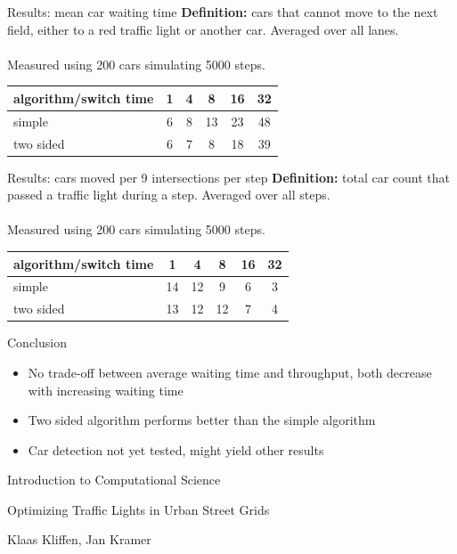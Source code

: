 \documentclass[11pt]{beamer}
\begin{document}
\begin{frame}{Results: mean car waiting time}
\textbf{Definition:} cars that cannot move to the next field, either to a 
red traffic light or another car. Averaged over all lanes.\\~\\
Measured using 200 cars simulating 5000 steps.

\begin{table}
\centering
\begin{tabular}{l|c|c|c|c|c}
algorithm/switch time & 1 & 4 & 8 & 16 & 32\\
\hline
simple & 6 & 8 & 13 & 23 & 48\\
two sided & 6 & 7 & 8 & 18 & 39\\
\end{tabular}
\end{table}
 
\end{frame}

\begin{frame}{Results: cars moved per 9 intersections per step}
\textbf{Definition:} total car count that passed a traffic light during a step.
Averaged over all steps.\\~\\
Measured using 200 cars simulating 5000 steps.
\begin{table}
\centering
\begin{tabular}{l|c|c|c|c|c}
algorithm/switch time & 1 & 4 & 8 & 16 & 32\\
\hline
simple & 14 & 12 & 9 & 6 & 3\\
two sided & 13 & 12 & 12 & 7 & 4\\
\end{tabular}
\end{table}
 
\end{frame}


\begin{frame}{Conclusion}

\begin{itemize}
 \item No trade-off between average waiting time and throughput, both decrease with increasing waiting time
 \item Two sided algorithm performs better than the simple algorithm
 \item Car detection not yet tested, might yield other results
\end{itemize}

    
\end{frame}

\begin{frame}{Introduction to Computational Science}
\begin{center}
{\large Optimizing Traffic Lights in Urban Street Grids}\\
\end{center}

\begin{center}
Klaas Kliffen, Jan Kramer
\end{center}

    
\end{frame}
\end{document}
